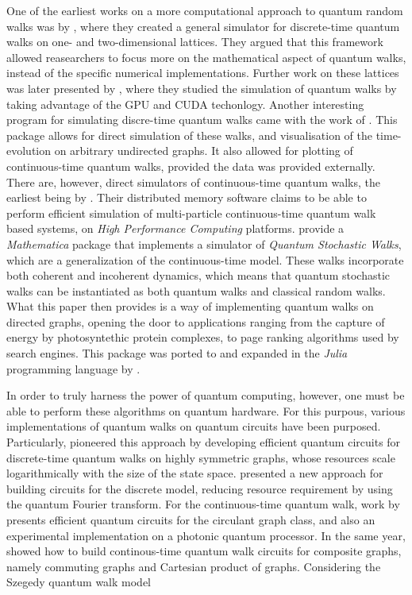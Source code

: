 \documentclass[../../dissertation.tex]{subfiles}
\begin{document}
One of the earliest works on a more computational approach to quantum random
walks was by \cite{marquezino2008}, where they created a general simulator for
discrete-time quantum walks on one- and two-dimensional lattices. They argued
that this framework allowed reasearchers to focus more on the mathematical
aspect of quantum walks, instead of the specific numerical implementations.
Further work on these lattices was later presented by \cite{sawerwain2010},
where they studied the simulation of quantum walks by taking advantage of the
GPU and CUDA techonlogy. Another interesting program for simulating discre-time
quantum walks came with the work of \cite{berry2011}. This package allows for
direct simulation of these walks, and visualisation of the time-evolution on
arbitrary undirected graphs. It also allowed for plotting of continuous-time
quantum walks, provided the data was provided externally. 
There are, however, direct simulators of continuous-time quantum walks, the
earliest being by \cite{izaac2015}. Their distributed memory software claims to
be able to perform efficient simulation of multi-particle continuous-time
quantum walk based systems, on \textit{High Performance Computing} platforms.
\cite{falloon2017a} provide a \textit{Mathematica} package that implements a
simulator of \textit{Quantum Stochastic Walks}, which are a generalization of
the continuous-time model. These walks incorporate both coherent and incoherent
dynamics, which means that quantum stochastic walks can be instantiated as both
quantum walks and classical random walks. What this paper then provides is a
way of implementing quantum walks on directed graphs, opening the door to
applications ranging from the capture of energy by photosyntethic protein
complexes, to page ranking algorithms used by search engines. This package was
ported to and expanded in the \textit{Julia} programming language by
\cite{glos2018}.\par
In order to truly harness the power of quantum computing, however, one must be
able to perform these algorithms on quantum hardware. For this purpous, various
implementations of quantum walks on quantum circuits have been purposed.
Particularly, \cite{douglaswang07} pioneered this approach by developing
efficient quantum circuits for discrete-time quantum walks on highly symmetric
graphs, whose resources scale logarithmically with the size of the state space.
\cite{shakeel2020} presented a new approach for building circuits for the
discrete model, reducing resource requirement by using the quantum Fourier
transform. 
For the continuous-time quantum walk, work by \cite{qiang2016} presents
efficient quantum circuits for the circulant graph class, and also an
experimental implementation on a photonic quantum processor. In the same year,
\cite{loke2017} showed how to build continous-time quantum walk circuits for
composite graphs, namely commuting graphs and Cartesian product of graphs.
Considering the Szegedy quantum walk model
\end{document}
